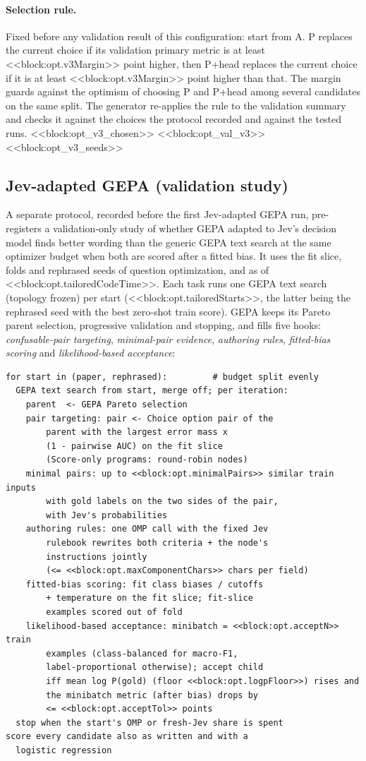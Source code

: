 \paragraph{Selection rule.}
Fixed before any validation result of this configuration: start from A. P replaces the current choice if its validation primary metric is at least <<block:opt.v3Margin>> point higher, then P+head replaces the current choice if it is at least <<block:opt.v3Margin>> point higher than that. The margin guards against the optimism of choosing P and P+head among several candidates on the same split. The generator re-applies the rule to the validation summary and checks it against the choices the protocol recorded and against the tested runs.
<<block:opt_v3_chosen>>
<<block:opt_val_v3>>
<<block:opt_v3_seeds>>

\subsection{Jev-adapted GEPA (validation study)}\label{app:opt-tailored}
A separate protocol, recorded before the first Jev-adapted GEPA run, pre-registers a validation-only study of whether GEPA adapted to Jev's decision model finds better wording than the generic GEPA text search at the same optimizer budget when both are scored after a fitted bias. It uses the fit slice, folds and rephrased seeds of question optimization, and \jevopt{} as of <<block:opt.tailoredCodeTime>>. Each task runs one GEPA text search (topology frozen) per start (<<block:opt.tailoredStarts>>, the latter being the rephrased seed with the best zero-shot train score). GEPA keeps its Pareto parent selection, progressive validation and stopping, and \jevopt{} fills five hooks: \emph{confusable-pair targeting}, \emph{minimal-pair evidence}, \emph{authoring rules}, \emph{fitted-bias scoring} and \emph{likelihood-based acceptance}:
\par{\scriptsize
\begin{verbatim}
for start in (paper, rephrased):         # budget split evenly
  GEPA text search from start, merge off; per iteration:
    parent  <- GEPA Pareto selection
    pair targeting: pair <- Choice option pair of the
        parent with the largest error mass x
        (1 - pairwise AUC) on the fit slice
        (Score-only programs: round-robin nodes)
    minimal pairs: up to <<block:opt.minimalPairs>> similar train inputs
        with gold labels on the two sides of the pair,
        with Jev's probabilities
    authoring rules: one OMP call with the fixed Jev
        rulebook rewrites both criteria + the node's
        instructions jointly
        (<= <<block:opt.maxComponentChars>> chars per field)
    fitted-bias scoring: fit class biases / cutoffs
        + temperature on the fit slice; fit-slice
        examples scored out of fold
    likelihood-based acceptance: minibatch = <<block:opt.acceptN>> train
        examples (class-balanced for macro-F1,
        label-proportional otherwise); accept child
        iff mean log P(gold) (floor <<block:opt.logpFloor>>) rises and
        the minibatch metric (after bias) drops by
        <= <<block:opt.acceptTol>> points
  stop when the start's OMP or fresh-Jev share is spent
score every candidate also as written and with a
  logistic regression
\end{verbatim}
}
